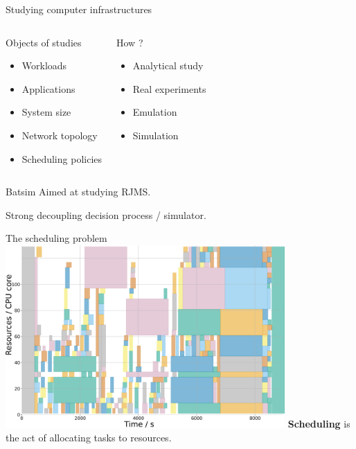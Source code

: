 \documentclass[12pt, aspectratio=43]{beamer}
\begin{document}
\begin{frame}{Studying computer infrastructures}
	\begin{columns}
		\begin{exampleblock}{Objects of studies}
			\begin{itemize}
				\item Workloads
				\item Applications
				\item System size
				\item Network topology
				\item Scheduling policies
			\end{itemize}
		\end{exampleblock}

		\begin{block}{How ?}
			\begin{itemize}
				\item Analytical study
				\item Real experiments
				\item Emulation
				\item Simulation
			\end{itemize}
		\end{block}
	\end{columns}


\end{frame}

\begin{frame}{Batsim}
	Aimed at studying RJMS.

	Strong decoupling decision process / simulator.
\end{frame}

\begin{frame}{The scheduling problem}
	\centering
	\includegraphics[width=0.8\textwidth]{../imgs/gantt_small.png}
	\textbf{Scheduling} is the act of allocating tasks to resources.
\end{frame}
\end{document}
